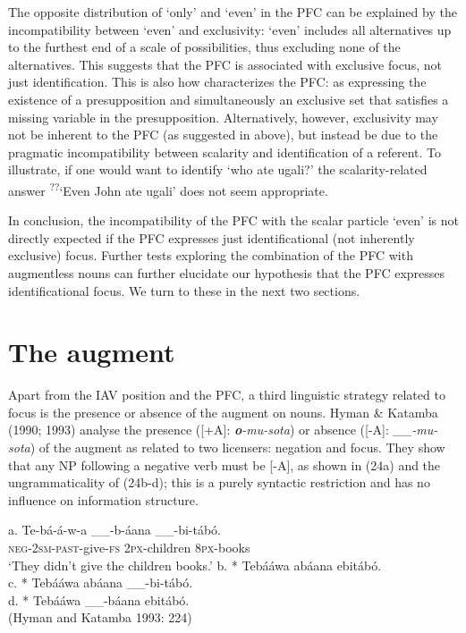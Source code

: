 \documentclass[output=paper]{langsci/langscibook}
\begin{document}
The opposite distribution of ‘only’ and ‘even’ in the PFC can be explained by the incompatibility between ‘even’ and exclusivity: ‘even’ includes all alternatives up to the furthest end of a scale of possibilities, thus excluding none of the alternatives. This suggests that the PFC is associated with exclusive focus, not just identification. This is also how \citet[52]{Walusimbi1996} characterizes the PFC: as expressing the existence of a presupposition and simultaneously an exclusive set that satisfies a missing variable in the presupposition. Alternatively, however, exclusivity may not be inherent to the PFC (as suggested in  above), but instead be due to the pragmatic incompatibility between scalarity and identification of a referent. To illustrate, if one would want to identify ‘who ate ugali?’ the scalarity-related answer \textsuperscript{??}‘Even John ate ugali’ does not seem appropriate.

  In conclusion, the incompatibility of the PFC with the scalar particle ‘even’ is not directly expected if the PFC expresses just identificational (not inherently exclusive) focus. Further tests exploring the combination of the PFC with augmentless nouns can further elucidate our hypothesis that the PFC expresses identificational focus. We turn to these in the next two sections.

\section{The augment}

Apart from the IAV position and the PFC, a third linguistic strategy related to focus is the presence or absence of the augment on nouns. Hyman \& Katamba (1990; 1993) analyse the presence ([+A]: \textbf{\textit{o}}\textit{-mu-sota}) or absence ([-A]: \textit{\_\_-mu-sota}) of the augment as related to two licensers: negation and focus. They show that any NP following a negative verb must be [-A], as shown in (24a) and the ungrammaticality of (24b-d); this is a purely syntactic restriction and has no influence on information structure.

\ea
\ea
\gll a.  Te-bá-á-w-a      \_\_-b-áana    \_\_-bi-tábó.\\
       \textsc{neg}-\textsc{2sm}-\textsc{past}-give-\textsc{fs}       \textsc{2px}-children       \textsc{8px}-books\\
\glt   ‘They didn't give the children books.’
\ex b.  * Tebááwa abáana ebitábó.\\
\ex c.  * Tebááwa abáana \_\_-bi-tábó.\\
\ex d.  * Tebááwa \_\_-báana ebitábó. \\
\glt (Hyman and Katamba 1993: 224)
\z
\z
\end{document}
